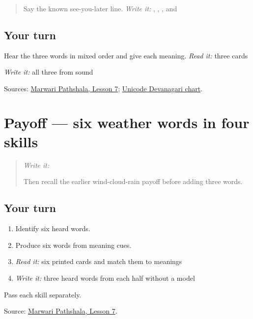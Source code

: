 \begin{quote}
Say the known see-you-later line. \emph{Write it:} \textbf{}, \textbf{}, \textbf{}, and \textbf{}
\end{quote}

\subsection*{Your turn}
Hear the three words in mixed order and give each meaning. \emph{Read it:} three cards

\emph{Write it:} all three from sound

\begin{tcolorbox}[breakable,colback=teal!4,colframe=teal!35!black,title={Before you move on}]
Sources: \href{https://www.marwaripathshala.com/marwari-lesson-7-english}{Marwari Pathshala, Lesson 7}; \href{https://www.unicode.org/charts/PDF/U0900.pdf}{Unicode Devanagari chart}.
\end{tcolorbox}
\section[Practice]{Payoff — six weather words in four skills}

\label{lesson:MW-C12-weather-six}



\begin{quote}
\emph{Write it:} \textbf{}

Then recall the earlier wind-cloud-rain payoff before adding three words.
\end{quote}

\subsection*{Your turn}
\begin{enumerate}
\raggedright
  \item Identify six heard words.
  \item Produce six words from meaning cues.
  \item \emph{Read it:} six printed cards and match them to meanings
  \item \emph{Write it:} three heard words from each half without a model
\end{enumerate}

Pass each skill separately.

\begin{tcolorbox}[breakable,colback=teal!4,colframe=teal!35!black,title={Before you move on}]
Source: \href{https://www.marwaripathshala.com/marwari-lesson-7-english}{Marwari Pathshala, Lesson 7}.
\end{tcolorbox}
